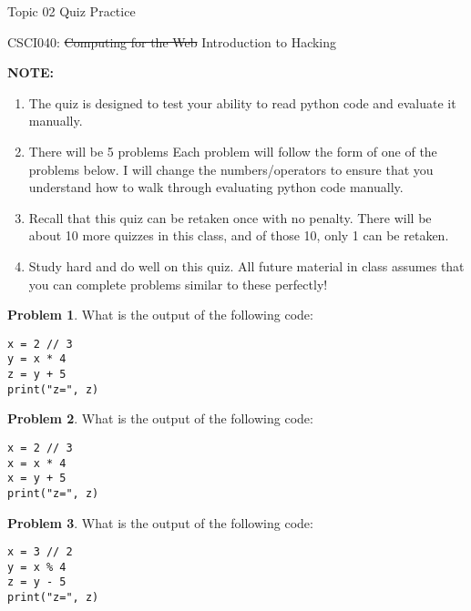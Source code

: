 \documentclass[10pt]{article}
\theoremstyle{definition}
\newtheorem{problem}{Problem}
\begin{document}
\begin{center}
    {
\Large
    Topic 02 Quiz Practice
}

    \vspace{0.1in}
    CSCI040: \sout{Computing for the Web} Introduction to Hacking

    \vspace{0.1in}
\end{center}

\noindent
\textbf{NOTE:}
\begin{enumerate}
\item
The quiz is designed to test your ability to read python code and evaluate it manually.
\item
There will be 5 problems
Each problem will follow the form of one of the problems below.
I will change the numbers/operators to ensure that you understand how to walk through evaluating python code manually.
\item
Recall that this quiz can be retaken once with no penalty.
There will be about 10 more quizzes in this class,
and of those 10, only 1 can be retaken.
\item
Study hard and do well on this quiz.
All future material in class assumes that you can complete problems similar to these perfectly!
\end{enumerate}
\vspace{0.15in}

\begin{problem}
    What is the output of the following code:
\end{problem}
\begin{lstlisting}
x = 2 // 3
y = x * 4
z = y + 5
print("z=", z)
\end{lstlisting}
\vspace{1.5in}

\begin{problem}
    What is the output of the following code:
\end{problem}
\begin{lstlisting}
x = 2 // 3
x = x * 4
x = y + 5
print("z=", z)
\end{lstlisting}
\vspace{1.5in}

\begin{problem}
    What is the output of the following code:
\end{problem}
\begin{lstlisting}
x = 3 // 2
y = x % 4
z = y - 5
print("z=", z)
\end{lstlisting}
\vspace{1.5in}
\end{document}
